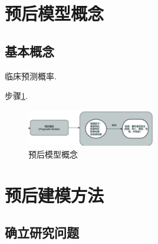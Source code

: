 \documentclass{article}
\begin{document}



\title{\TITLE}
\author{\AUTHOR~ \STUDENTNO}
\date{\today}
\maketitle

\thispagestyle{empty}

\begin{abstract}
    本文首先介
    
    \textbf{关键字:} 预后模型，机器学习，智能诊断


\end{abstract}


\newpage
\pagestyle{plain}
\tableofcontents


\newpage
\pagestyle{fancy}
\fancyhf{}               %
\renewcommand{\headrulewidth}{0pt} %
 \setcounter{page}{1} %

\section{预后模型概念}
    \subsection{基本概念}
    临床预测概率\cite{chen2020overview}.

    步骤\ref{fig:a}.
    \begin{figure}[h]
        \centering
        \includegraphics[width=0.5\textwidth]{2fig/a.png}
        \caption{预后模型概念}
        \label{fig:a}
    \end{figure}
    
\section{预后建模方法}
    \subsection{确立研究问题}
    
\end{document}
